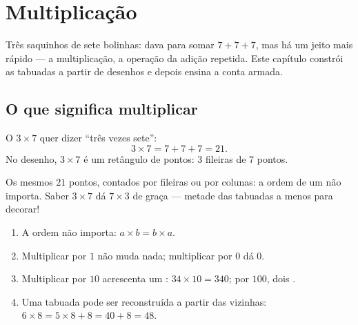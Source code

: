 \chapter{Multiplicação}\label{ch:g3:mult}

Três saquinhos de sete bolinhas: dava para somar $7 + 7 + 7$, mas há
um jeito mais rápido --- a multiplicação, a operação da adição
repetida. Este capítulo constrói as tabuadas a partir de desenhos e
depois ensina a conta armada.

\section{O que significa multiplicar}

\begin{definition}[Multiplicação]\label{def:g3:mult:def}
O  $3 \times 7$ quer dizer ``três vezes sete'':
\[
3 \times 7 = 7 + 7 + 7 = 21 .
\]
No desenho, $3 \times 7$ é um retângulo de pontos: $3$ fileiras de
$7$ pontos.
\end{definition}

\begin{omfigure}

{\small Os mesmos $21$ pontos, contados por fileiras ou por colunas:
a ordem de um  não importa. Saber $3 \times 7$ dá
$7 \times 3$ de graça --- metade das tabuadas a menos para
decorar!}
\end{omfigure}

\begin{proposition}[Regras que ajudam]\label{prop:g3:mult:rules}
\begin{enumerate}
  \item A ordem não importa: $a \times b = b \times a$.
  \item Multiplicar por $1$ não muda nada; multiplicar por $0$ dá
        $0$.
  \item Multiplicar por $10$ acrescenta um : $34 \times 10 =
        340$; por $100$, dois .
  \item Uma tabuada pode ser reconstruída a partir das vizinhas:
        $6 \times 8 = 5 \times 8 + 8 = 40 + 8 = 48$.
\end{enumerate}
\end{proposition}
\admitted

